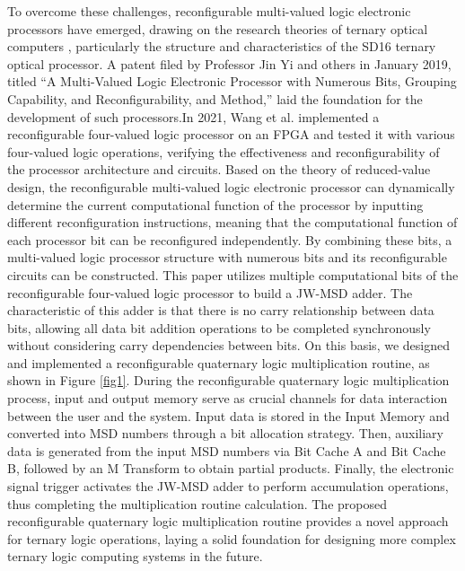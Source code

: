 \documentclass[electronics,article,accept,pdftex,moreauthors]{Definitions/mdpi}
\begin{document}
To overcome these challenges, reconfigurable multi-valued logic electronic processors have emerged, drawing on the research theories of ternary optical computers \cite{ref1,ref2,ref3,ref4,ref5,ref6,ref7,ref19}, particularly the structure and characteristics of the SD16 ternary optical processor\cite{ref21,ref22,ref23,ref24}. A patent filed by Professor Jin Yi and others in January 2019, titled “A Multi-Valued Logic Electronic Processor with Numerous Bits, Grouping Capability, and Reconfigurability, and Method,” laid the foundation for the development of such processors\cite{ref8}.In 2021, Wang et al. implemented a reconfigurable four-valued logic processor on an FPGA and tested it with various four-valued logic operations\cite{ref9,ref10,ref11,ref12}, verifying the effectiveness and reconfigurability of the processor architecture and circuits. Based on the theory of reduced-value design\cite{ref13,ref14}, the reconfigurable multi-valued logic electronic processor can dynamically determine the current computational function of the processor by inputting different reconfiguration instructions, meaning that the computational function of each processor bit can be reconfigured independently. By combining these bits, a multi-valued logic processor structure with numerous bits and its reconfigurable circuits can be constructed. This paper utilizes multiple computational bits of the reconfigurable four-valued logic processor to build a JW-MSD adder. The characteristic of this adder is that there is no carry relationship between data bits, allowing all data bit addition operations to be completed synchronously without considering carry dependencies between bits. On this basis, we designed and implemented a reconfigurable quaternary logic multiplication routine, as shown in Figure \ref{fig1}. During the reconfigurable quaternary logic multiplication process, input and output memory serve as crucial channels for data interaction between the user and the system. Input data is stored in the Input Memory and converted into MSD numbers through a bit allocation strategy. Then, auxiliary data is generated from the input MSD numbers via Bit Cache A and Bit Cache B, followed by an M Transform to obtain partial products. Finally, the electronic signal trigger activates the JW-MSD adder to perform accumulation operations, thus completing the multiplication routine calculation. The proposed reconfigurable quaternary logic multiplication routine provides a novel approach for ternary logic operations, laying a solid foundation for designing more complex ternary logic computing systems in the future.
\end{document}
